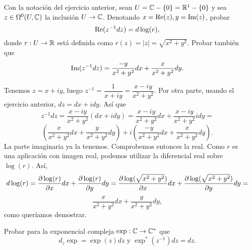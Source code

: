 \documentclass[twoside]{article}
\begin{document}
\newpage

\begin{ejercicio}{3.6}
Con la notación del ejercicio anterior, sean $U=\mathbb{C}-\{0\}=\mathbb{R}^1-\{0\}$ y sea $z\in\Omega^0(U,\mathbb{C})$ la inclusión $U\to\mathbb{C}$. Denotando $x=\operatorname{Re}(z), y=\operatorname{Im}(z)$, probar
\[
\operatorname{Re}(z^{-1}dz)=d\log(r),
\]
donde $r:U\to\mathbb{R}$ está definida como $r(z)=|z|=\sqrt{x^2+y^2}$. Probar también que
\[
\operatorname{Im}(z^{-1}dz)=\frac{-y}{x^2+y^2}dx+\frac{x}{x^2+y^2}dy.
\]
\end{ejercicio}
\begin{solucion}
Tenemos $z=x+iy$, luego $z^{-1}=\dfrac{1}{x+iy}=\dfrac{x-iy}{x^2+y^2}$. Por otra parte, usando el ejercicio anterior, $dz=dx+idy$. Así que 
\[
z^{-1}dz=\dfrac{x-iy}{x^2+y^2}(dx+idy)=\dfrac{x-iy}{x^2+y^2}dx+\dfrac{x-iy}{x^2+y^2}idy=
\]
\[
\left(\dfrac{x}{x^2+y^2}dx+\dfrac{y}{x^2+y^2}dy\right)+i\left(\frac{-y}{x^2+y^2}dx+\frac{x}{x^2+y^2}dy\right).
\]
La parte imaginaria ya la tenemos. Comprobemos entonces la real. Como $r$ es una aplicación con imagen real, podemos utilizar la diferencial real sobre $\log(r)$. Así,
\[
d\log(r)=\frac{\partial \log(r)}{\partial x}dx+\frac{\partial \log(r)}{\partial y}dy=\frac{\partial \log(\sqrt{x^2+y^2})}{\partial x}dx+\frac{\partial \log(\sqrt{x^2+y^2})}{\partial y}dy=
\]
\[
\dfrac{x}{x^2+y^2}dx+\dfrac{y}{x^2+y^2}dy,
\]
como queríamos demostrar.
\end{solucion}

\newpage

\begin{ejercicio}{3.7}
Probar para la exponencial compleja $\exp :\mathbb{C}\to\mathbb{C}^*$ que
\[
d_z\exp =\exp(z)dz\text{ y } \exp^*(z^{-1})dz=dz.
\]
\end{ejercicio}
\begin{solucion}

\end{solucion}
\end{document}
